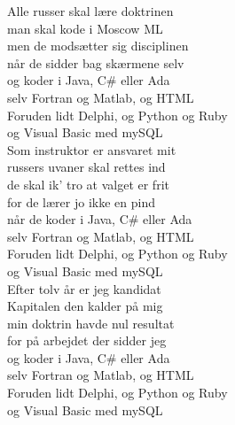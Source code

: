Alle russer skal lære doktrinen\\
man skal kode i Moscow ML\\
men de modsætter sig disciplinen\\
når de sidder bag skærmene selv\\


og koder i Java, C\# eller Ada\\
selv Fortran og Matlab, og HTML\\
Foruden lidt Delphi, og Python og Ruby\\
og Visual Basic med mySQL\\


Som instruktor er ansvaret mit\\
russers uvaner skal rettes ind\\
de skal ik' tro at valget er frit\\
for de lærer jo ikke en pind\\


når de koder i Java, C\# eller Ada\\
selv Fortran og Matlab, og HTML\\
Foruden lidt Delphi, og Python og Ruby\\
og Visual Basic med mySQL\\


Efter tolv år er jeg kandidat\\
Kapitalen den kalder på mig\\
min doktrin havde nul resultat\\
for på arbejdet der sidder jeg\\


og koder i Java, C\# eller Ada\\
selv Fortran og Matlab, og HTML\\
Foruden lidt Delphi, og Python og Ruby\\
og Visual Basic med mySQL\\
